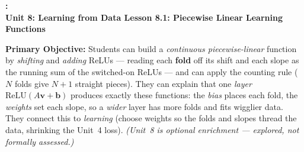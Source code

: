 \documentclass[10pt]{article}
\newcommand{\vv}{\mathbf{v}}
\newcommand{\bb}{\mathbf{b}}
\newcommand{\relu}{\mathrm{ReLU}}
\newcommand{\UnitNumberName}{Unit 8: Learning from Data \quad}
\newcommand{\LessonNumberName}{Lesson 8.1: Piecewise Linear Learning Functions}
\begin{document}
\begin{center}
    {\Large\bfseries \CourseName: \SchoolYear \\
    {\small\bfseries \UnitNumberName \LessonNumberName}}
\end{center}

\begin{tcolorbox}[colback=blush, colframe=burgundy, boxrule=0.9pt, arc=2mm,
    left=2mm, right=2mm, top=1.5mm, bottom=1.5mm]
    \textbf{Primary Objective:} Students can build a \emph{continuous piecewise-linear} function by
    \emph{shifting} and \emph{adding} ReLUs --- reading each \textbf{fold} off its shift and each slope as
    the running sum of the switched-on ReLUs --- and can apply the counting rule ($N$ folds give $N+1$
    straight pieces). They can explain that one \emph{layer} $\relu(A\vv+\bb)$ produces exactly these
    functions: the \emph{bias} places each fold, the \emph{weights} set each slope, so a \emph{wider} layer
    has more folds and fits wigglier data. They connect this to \emph{learning} (choose weights so the folds
    and slopes thread the data, shrinking the Unit~4 loss). \emph{(Unit~8 is optional enrichment ---
    explored, not formally assessed.)}
\end{tcolorbox}
\end{document}
